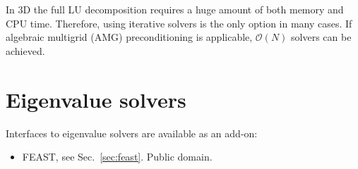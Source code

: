 In 3D the full LU decomposition requires a huge
amount of both memory and CPU time. Therefore, using iterative solvers is
the only option in many cases.
If algebraic multigrid (AMG) preconditioning is applicable, $\mathcal{O}(N)$
solvers can be achieved.

\section{Eigenvalue solvers}

Interfaces to eigenvalue solvers are available as an add-on:
\begin{itemize}
   \item FEAST, see Sec.~\ref{sec:feast}. Public domain. 
\end{itemize}

